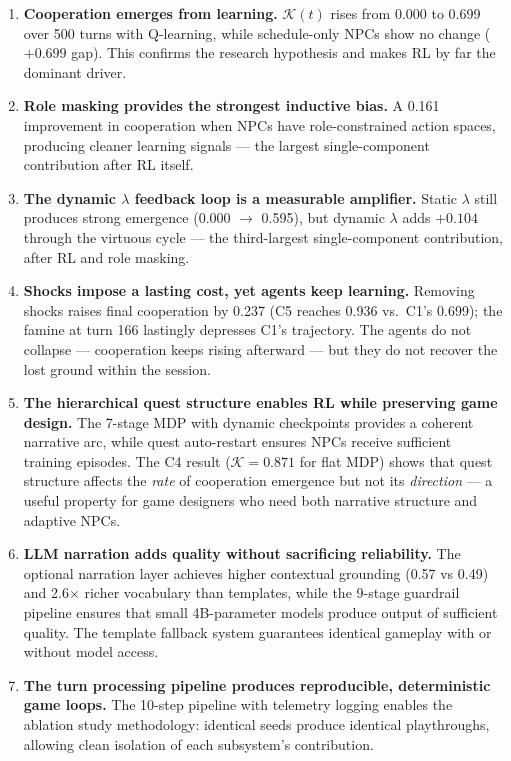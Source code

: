 \documentclass[12pt, a4paper, oneside]{report}
\begin{document}
\begin{enumerate}
    \item \textbf{Cooperation emerges from learning.} $\mathcal{K}(t)$ rises from 0.000 to 0.699 over 500 turns with Q-learning, while schedule-only NPCs show no change ($+0.699$ gap). This confirms the research hypothesis and makes RL by far the dominant driver.
    \item \textbf{Role masking provides the strongest inductive bias.} A 0.161 improvement in cooperation when NPCs have role-constrained action spaces, producing cleaner learning signals --- the largest single-component contribution after RL itself.
    \item \textbf{The dynamic $\lambda$ feedback loop is a measurable amplifier.} Static $\lambda$ still produces strong emergence (0.000 $\to$ 0.595), but dynamic $\lambda$ adds $+0.104$ through the virtuous cycle --- the third-largest single-component contribution, after RL and role masking.
    \item \textbf{Shocks impose a lasting cost, yet agents keep learning.} Removing shocks raises final cooperation by 0.237 (C5 reaches 0.936 vs.\ C1's 0.699); the famine at turn 166 lastingly depresses C1's trajectory. The agents do not collapse --- cooperation keeps rising afterward --- but they do not recover the lost ground within the session.
    \item \textbf{The hierarchical quest structure enables RL while preserving game design.} The 7-stage MDP with dynamic checkpoints provides a coherent narrative arc, while quest auto-restart ensures NPCs receive sufficient training episodes. The C4 result ($\mathcal{K} = 0.871$ for flat MDP) shows that quest structure affects the \textit{rate} of cooperation emergence but not its \textit{direction} --- a useful property for game designers who need both narrative structure and adaptive NPCs.
    \item \textbf{LLM narration adds quality without sacrificing reliability.} The optional narration layer achieves higher contextual grounding (0.57 vs 0.49) and 2.6$\times$ richer vocabulary than templates, while the 9-stage guardrail pipeline ensures that small 4B-parameter models produce output of sufficient quality. The template fallback system guarantees identical gameplay with or without model access.
    \item \textbf{The turn processing pipeline produces reproducible, deterministic game loops.} The 10-step pipeline with telemetry logging enables the ablation study methodology: identical seeds produce identical playthroughs, allowing clean isolation of each subsystem's contribution.
\end{enumerate}
\end{document}
